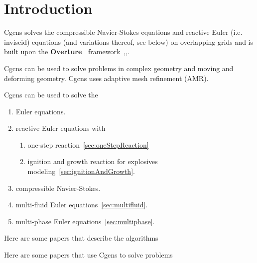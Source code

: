 \documentclass{article}
\newcommand{\Overture}{{\bf Over\-ture\ }}
\begin{document}
\clearpage
\tableofcontents

\vfill\eject


\section{Introduction}


Cgcns solves the compressible Navier-Stokes equations and reactive Euler (i.e. inviscid) equations
(and variations thereof, see below)
on overlapping grids and is built upon the \Overture 
framework~\cite{Brown97},\cite{Henshaw96a},\cite{iscope97}. 

Cgcns can be used to solve problems in complex geometry and moving and deforming
geometry. Cgcns uses adaptive mesh refinement (AMR).

Cgcns can be used to solve the
\begin{enumerate}
   \item Euler equations.
   \item reactive Euler equations with
      \begin{enumerate}
         \item one-step reaction~\ref{sec:oneStepReaction}
         \item ignition and growth reaction for explosives modeling~\ref{sec:ignitionAndGrowth}.
      \end{enumerate}
    \item compressible Navier-Stokes.
    \item multi-fluid Euler equations~\ref{sec:multifluid}.
    \item multi-phase Euler equations~\ref{sec:multiphase}.
\end{enumerate}

Here are some papers that describe the algorithms 
\begin{bibunit}[unsrt] %
\nocite{lrb2012a,mprxn2009,pog2008a,mfjwl2006,mog2006,reactamr2003b}
\end{bibunit}

Here are some papers that use Cgcns to solve problems
\begin{bibunit}[unsrt] %
\nocite{hybridMultiphase2012a,fsi2012,OzlemSchwendemanKapilaHenshaw2012,SchwendemanKapilaHenshawLeeds2012,mprxn2009,fct2009,kapila2006,eliasson2007,mfrxn2007,mfjwl2006,ReedFriedHenshawTarver2006}
\end{bibunit}
\end{document}
